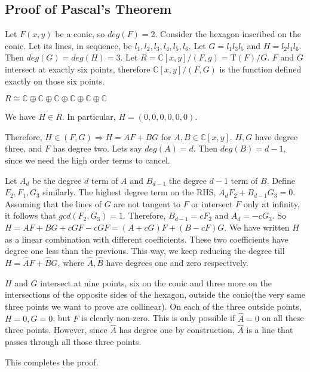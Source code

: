 \subsection{Proof of Pascal's Theorem}
Let $F(x, y)$ be a conic, so $deg(F) = 2$.
Consider the hexagon inscribed on the conic.
Let its lines, in sequence, be $l_{1}, l_{2}, l_{3}, l_{4}, l_{5}, l_{6}$.
Let $G = l_{1} l_{3} l_{5}$ and $H = l_{2} l_{4} l_{6}$.
Then $deg(G) = deg(H) = 3$.
Let $R = \mathbb{C}[x, y] \big/ (F, g) = \mathrm{T} (F) \big / G$.
$F$ and $G$ intersect at exactly six points, therefore $\mathbb{C}[x, y] \big/ (F, G)$ is the function defined exactly on those six points.
\begin{lemma} \label{lem:sixpoints}
  $R \cong \mathbb{C} \oplus \mathbb{C} \oplus \mathbb{C} \oplus \mathbb{C} \oplus \mathbb{C} \oplus \mathbb{C}$
\end{lemma}
We have $H \in R$.
In particular, $H = (0, 0, 0, 0, 0, 0)$.
\par
Therefore, $H \in (F, G) \Rightarrow H = AF + BG$ for $A, B \in \mathbb{C}[x, y]$.
$H, G$ have degree three, and $F$ has degree two.
Lets say $deg(A) = d$.
Then $deg(B) = d-1$, since we need the high order terms to cancel.
\par
Let $A_{d}$ be the degree $d$ term of $A$ and $B_{d-1}$ the degree $d-1$ term of $B$.
Define $F_{2}, F_{1}, G_{3}$ similarly.
The highest degree term on the RHS, $A_{d}F_{2} + B_{d-1}G_{3} = 0$.
Assuming that the lines of $G$ are not tangent to $F$ or intersect $F$ only at infinity, it follows that $gcd(F_{2}, G_{3}) = 1$.
Therefore, $B_{d-1} = c F_{2}$ and $A_{d} = -c G_{3}$.
So $H = AF + BG + cGF - cGF = (A + cG)F + (B - cF)G$.
We have written $H$ as a linear combination with different coefficients.
These two coefficients have degree one less than the previous.
This way, we keep reducing the degree till $H = \widehat{A} F + \widehat{B} G$, where $\widehat{A}, \widehat{B}$ have degrees one and zero respectively.
\par
$H$ and $G$ intersect at nine points, six on the conic and three more on the intersections of the opposite sides of the hexagon, outside the conic(the very same three points we want to prove are collinear).
On each of the three outside points, $H = 0, G = 0$, but $F$ is clearly non-zero.
This is only possible if $\widehat{A} = 0$ on all these three points.
However, since $\widehat{A}$ has degree one by construction, $\widehat{A}$ is a line that passes through all those three points.
\par
This completes the proof.
